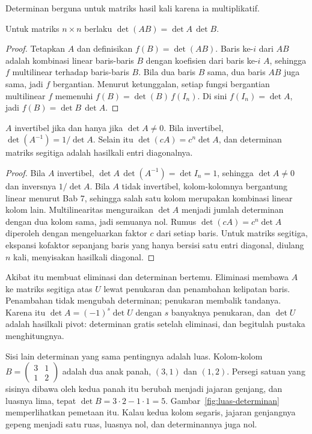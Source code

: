 Determinan berguna untuk matriks hasil kali karena ia multiplikatif.

\begin{teorema}
Untuk matriks $n\times n$ berlaku $\det(AB)=\det A\,\det B$.
\end{teorema}

\begin{proof}
Tetapkan $A$ dan definisikan $f(B)=\det(AB)$. Baris ke-$i$ dari $AB$ adalah kombinasi linear
baris-baris $B$ dengan koefisien dari baris ke-$i$ $A$, sehingga $f$ multilinear terhadap
baris-baris $B$. Bila dua baris $B$ sama, dua baris $AB$ juga sama, jadi $f$ bergantian.
Menurut ketunggalan, setiap fungsi bergantian multilinear $f$ memenuhi
$f(B)=\det(B)\,f(I_{n})$. Di sini $f(I_{n})=\det A$, jadi
$f(B)=\det B\,\det A$.
\end{proof}

\begin{akibat}
$A$ invertibel jika dan hanya jika $\det A\neq0$. Bila invertibel,
$\det(A^{-1})=1/\det A$. Selain itu $\det(cA)=c^{n}\det A$, dan determinan matriks
segitiga adalah hasilkali entri diagonalnya.
\end{akibat}

\begin{proof}
Bila $A$ invertibel, $\det A\,\det(A^{-1})=\det I_{n}=1$, sehingga $\det A\neq0$ dan
inversnya $1/\det A$. Bila $A$ tidak invertibel, kolom-kolomnya bergantung linear menurut
Bab 7, sehingga salah satu kolom merupakan kombinasi linear kolom lain. Multilinearitas
menguraikan $\det A$ menjadi jumlah determinan dengan dua kolom sama, jadi semuanya nol.
Rumus $\det(cA)=c^{n}\det A$ diperoleh dengan mengeluarkan faktor $c$ dari setiap baris.
Untuk matriks segitiga, ekspansi kofaktor sepanjang baris yang hanya bersisi satu entri
diagonal, diulang $n$ kali, menyisakan hasilkali diagonal.
\end{proof}

Akibat itu membuat eliminasi dan determinan bertemu. Eliminasi membawa $A$ ke matriks
segitiga atas $U$ lewat penukaran dan penambahan kelipatan baris. Penambahan tidak mengubah
determinan; penukaran membalik tandanya. Karena itu $\det A=(-1)^{s}\det U$ dengan $s$
banyaknya penukaran, dan $\det U$ adalah hasilkali pivot: determinan gratis setelah eliminasi,
dan begitulah pustaka menghitungnya.

Sisi lain determinan yang sama pentingnya adalah luas. Kolom-kolom
$B=\begin{pmatrix}3&1\\ 1&2\end{pmatrix}$ adalah dua anak panah, $(3,1)$ dan $(1,2)$.
Persegi satuan yang sisinya dibawa oleh kedua panah itu berubah menjadi jajaran genjang,
dan luasnya lima, tepat $\det B=3\cdot2-1\cdot1=5$. Gambar~\ref{fig:luas-determinan}
memperlihatkan pemetaan itu. Kalau kedua kolom segaris, jajaran genjangnya gepeng menjadi
satu ruas, luasnya nol, dan determinannya juga nol.

